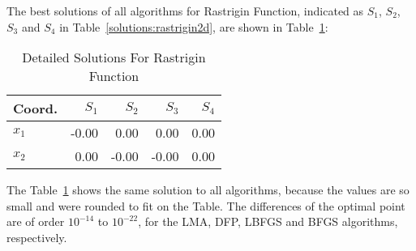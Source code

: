 
The best solutions of all algorithms for Rastrigin Function, indicated as
$S_{1}$, $S_{2}$, $S_{3}$ and $S_{4}$ in Table~\ref{solutions:rastrigin2d}, are shown
in Table~\ref{detailedsolutions:rastrigin2d}:

\begin{table}[H]
\centering
\caption{Detailed Solutions For Rastrigin Function}
\label{detailedsolutions:rastrigin2d}
\begin{tabular}{lrrrr}
\toprule
 Coord. &  $S_{1}$ &  $S_{2}$ &  $S_{3}$ &  $S_{4}$ \\
\midrule
$x_{1}$ &    -0.00 &     0.00 &     0.00 &     0.00 \\
$x_{2}$ &     0.00 &    -0.00 &    -0.00 &     0.00 \\
\bottomrule
\end{tabular}
\end{table}

The Table~\ref{detailedsolutions:rastrigin2d} shows the same solution to all algorithms, because the values are so small
and were rounded to fit on the Table. The differences of the optimal point are of order $10^{-14}$ to $10^{-22}$,
for the LMA, DFP, LBFGS and BFGS algorithms, respectively.
